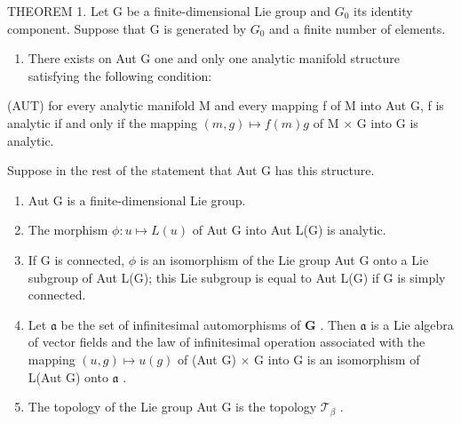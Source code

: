 THEOREM 1. Let G be a finite-dimensional Lie group and \(G_{0}\) its identity component. Suppose that G is generated by \(G_{0}\) and a finite number of elements.

\begin{enumerate}
\def\labelenumi{(\roman{enumi})}
\tightlist
\item
  There exists on Aut G one and only one analytic manifold structure satisfying the following condition:
\end{enumerate}

(AUT) for every analytic manifold M and every mapping f of M into Aut G, f is analytic if and only if the mapping \((m, g) \mapsto f(m)g\) of M × G into G is analytic.

Suppose in the rest of the statement that Aut G has this structure.

\begin{enumerate}
\def\labelenumi{(\roman{enumi})}
\setcounter{enumi}{1}
\item
  Aut G is a finite-dimensional Lie group.
\item
  The morphism \(\phi: u \mapsto L(u)\) of Aut G into Aut L(G) is analytic.
\item
  If G is connected, \(\phi\) is an isomorphism of the Lie group Aut G onto a Lie subgroup of Aut L(G); this Lie subgroup is equal to Aut L(G) if G is simply connected.
\item
  Let \(\mathfrak{a}\) be the set of infinitesimal automorphisms of \(\mathbf{G}\) . Then \(\mathfrak{a}\) is a Lie algebra of vector fields and the law of infinitesimal operation associated with the mapping \((u, g) \mapsto u(g)\) of (Aut G) \(\times\) G into G is an isomorphism of L(Aut G) onto \(\mathfrak{a}\) .
\item
  The topology of the Lie group Aut G is the topology \(\mathcal{T}_{\beta}\) .
\end{enumerate}

